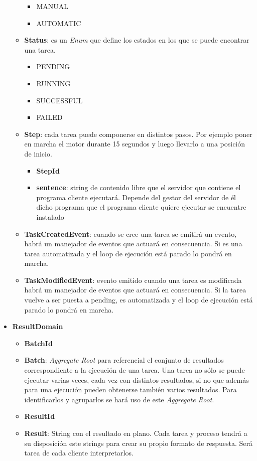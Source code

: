 \begin{itemize}
\begin{itemize}
        \begin{itemize}
            \item MANUAL
            \item AUTOMATIC
        \end{itemize}
        \item \textbf{Status}: es un \textit{Enum} que define los estados en los que se puede encontrar una tarea.
        \begin{itemize}
            \item PENDING
            \item RUNNING
            \item SUCCESSFUL
            \item FAILED
        \end{itemize}
        \item \textbf{Step}: cada tarea puede componerse en distintos pasos.
        Por ejemplo poner en marcha el motor durante 15 segundos y luego llevarlo a una posición de inicio.
        \begin{itemize}
            \item \textbf{StepId}
            \item \textbf{sentence}: string de contenido libre que el servidor que contiene el programa cliente ejecutará.
            Depende del gestor del servidor de él dicho programa que el programa cliente quiere ejecutar se encuentre instalado
        \end{itemize}
        \item \textbf{TaskCreatedEvent}: cuando se cree una tarea se emitirá un evento, habrá un manejador de eventos que actuará en consecuencia.
        Si es una tarea automatizada y el loop de ejecución está parado lo pondrá en marcha.
        \item \textbf{TaskModifiedEvent}: evento emitido cuando una tarea es modificada habrá un manejador de eventos que actuará en consecuencia.
        Si la tarea vuelve a ser puesta a pending, es automatizada y el loop de ejecución está parado lo pondrá en marcha.
    \end{itemize}
    \item \textbf{ResultDomain}
    \begin{itemize}
        \item \textbf{BatchId}
        \item \textbf{Batch}: \textit{Aggregate Root} para referencial el conjunto de resultados correspondiente a la ejecución de una tarea.
        Una tarea no sólo se puede ejecutar varias veces, cada vez con distintos resultados, si no que además para una ejecución pueden obtenerse también varios resultados.
        Para identificarlos y agruparlos se hará uso de este \textit{Aggregate Root}.
        \item \textbf{ResultId}
        \item \textbf{Result}: String con el resultado en plano.
        Cada tarea y proceso tendrá a su disposición este strings para crear su propio formato de respuesta.
        Será tarea de cada cliente interpretarlos.
    \end{itemize}
\end{itemize}

